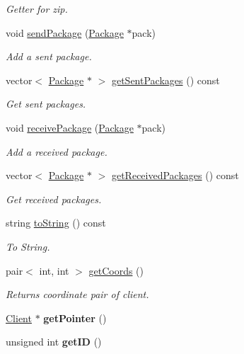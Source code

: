 \begin{DoxyCompactItemize}
\begin{DoxyCompactList}\small\item\em Getter for zip. \end{DoxyCompactList}\item 
void \hyperlink{classClient_a2127f6355c6d4fe400f3dd314e1fabc8}{send\+Package} (\hyperlink{classPackage}{Package} $\ast$pack)
\begin{DoxyCompactList}\small\item\em Add a sent package. \end{DoxyCompactList}\item 
vector$<$ \hyperlink{classPackage}{Package} $\ast$ $>$ \hyperlink{classClient_aff47cd6d18feba4c43f7ff495d73f495}{get\+Sent\+Packages} () const 
\begin{DoxyCompactList}\small\item\em Get sent packages. \end{DoxyCompactList}\item 
void \hyperlink{classClient_a1726c784a1c19701a13e12333cf906e5}{receive\+Package} (\hyperlink{classPackage}{Package} $\ast$pack)
\begin{DoxyCompactList}\small\item\em Add a received package. \end{DoxyCompactList}\item 
vector$<$ \hyperlink{classPackage}{Package} $\ast$ $>$ \hyperlink{classClient_aae2dee02f0951f418941234103c275ef}{get\+Received\+Packages} () const 
\begin{DoxyCompactList}\small\item\em Get received packages. \end{DoxyCompactList}\item 
string \hyperlink{classClient_a994ff91075daf477725ca055874e3e22}{to\+String} () const 
\begin{DoxyCompactList}\small\item\em To String. \end{DoxyCompactList}\item 
pair$<$ int, int $>$ \hyperlink{classClient_a00ea13c3af8a5eb6d931e73a5a00bdd4}{get\+Coords} ()
\begin{DoxyCompactList}\small\item\em Returns coordinate pair of client. \end{DoxyCompactList}\item 
\hyperlink{classClient}{Client} $\ast$ {\bfseries get\+Pointer} ()\hypertarget{classClient_a81f028cdd0ad080e4739d8b9ad4d757c}{}\label{classClient_a81f028cdd0ad080e4739d8b9ad4d757c}

\item 
unsigned int {\bfseries get\+ID} ()\hypertarget{classClient_ad03bbecd42ede5870a9f537fb7c01d97}{}\label{classClient_ad03bbecd42ede5870a9f537fb7c01d97}

\end{DoxyCompactItemize}
